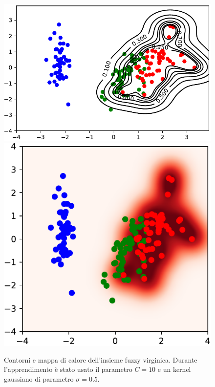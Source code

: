 \documentclass [11pt,a4paper,twoside,openright] {book}
\begin{document}
\begin{figure}[!b]
        \centering%
        \subfigure
          {\includegraphics[scale=.5]{figure/virginicamap.pdf}}\qquad\qquad
       \subfigure
          {\includegraphics[scale=.5]{figure/virginicaheat.pdf}}
          \caption{Contorni e mappa di calore dell'insieme fuzzy virginica. Durante l'apprendimento è stato usato il parametro $C=10$ e un kernel gaussiano di parametro $\sigma=0.5$.\label{fuzzyvirginica}}
\end{figure}
\end{document}
